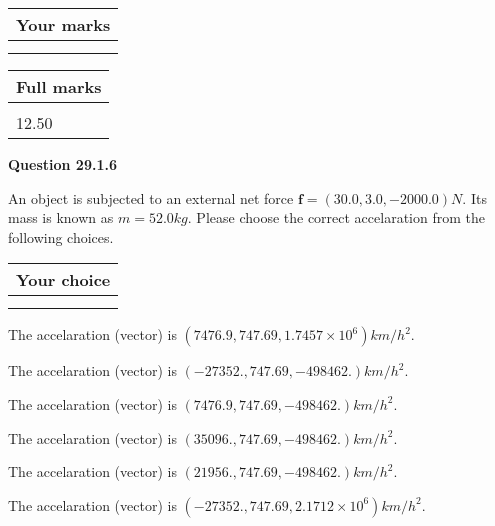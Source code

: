 \documentclass[12pt]{article}
\begin{document}
 
 

 

 
\vspace{0.3in}
  
\vspace{0.2in}
  
         \begin{tabular}{|l|}
\hline
 Your marks  \\
\hline
 \\ 
 \\ 
\hline
\end{tabular}
\hspace{0.05in} \begin{tabular}{|l|}
\hline
 Full marks  \\
\hline
 \\ 
12.50 \\
\hline
\end{tabular}
{\textbf{\Large{Question
29.1.6 
}}}
  
  
 
An object is subjected to an external net force $\mathbf{f}=(
30.0 ,
3.0,
-2000.0  )N$. Its mass is known as
$m= %
52.0  kg$. Please choose the correct accelaration
from the following choices.
 
  
  
\noindent\hspace{3.0in} \begin{tabular}{|l|}
\hline
Your choice \\
\hline
 \\ 
 \\ 
\hline
\end{tabular}
  
  
 
 
The accelaration (vector) is
$(
7476.9,
747.69 ,
1.7457 \times 10^{6}
)km/h^2.
$
 
 
The accelaration (vector) is
$(
-27352.,
747.69 ,
-498462.
)km/h^2.
$
 
 
The accelaration (vector) is
$(
7476.9,
747.69 ,
-498462.
)km/h^2.
$
 
 
The accelaration (vector) is
$(
35096.,
747.69 ,
-498462.
)km/h^2.
$
 
 
The accelaration (vector) is
$(
21956.,
747.69 ,
-498462.
)km/h^2.
$
 
 
The accelaration (vector) is
$(
-27352.,
747.69 ,
2.1712 \times 10^{6}
)km/h^2.
$
 
\end{document}
